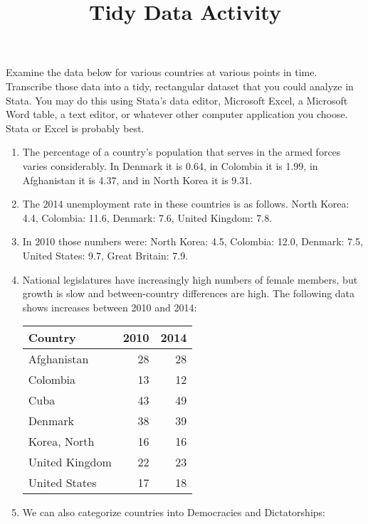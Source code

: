 \documentclass[a4paper,12pt]{article}
\title{Tidy Data Activity}
\author{}
\date{}
\begin{document}
\maketitle

\vspace{-2em}

\noindent Examine the data below for various countries at various points in time. Transcribe those data into a tidy, rectangular dataset that you could analyze in Stata. You may do this using Stata's data editor, Microsoft Excel, a Microsoft Word table, a text editor, or whatever other computer application you choose. Stata or Excel is probably best.

\begin{enumerate}\itemsep1em

\item The percentage of a country's population that serves in the armed forces varies considerably. In Denmark it is 0.64, in Colombia it is 1.99, in Afghanistan it is 4.37, and in North Korea it is 9.31.

\item The 2014 unemployment rate in these countries is as follows. North Korea: 4.4, Colombia: 11.6, Denmark: 7.6, United Kingdom: 7.8.

\item In 2010 those numbers were: North Korea: 4.5, Colombia: 12.0, Denmark: 7.5, United States: 9.7, Great Britain: 7.9.

\item National legislatures have increasingly high numbers of female members, but growth is slow and between-country differences are high. The following data shows increases between 2010 and 2014:

\begin{center}
\begin{tabular}{lrr}
Country & 2010 & 2014 \\ \hline
Afghanistan & 28 & 28 \\
Colombia & 13 & 12 \\
Cuba & 43 & 49 \\
Denmark & 38 & 39 \\
Korea, North & 16 & 16 \\
United Kingdom & 22 & 23 \\
United States & 17 & 18 \\
\end{tabular}
\end{center}

\item We can also categorize countries into Democracies and Dictatorships:


\end{enumerate}
\end{document}
